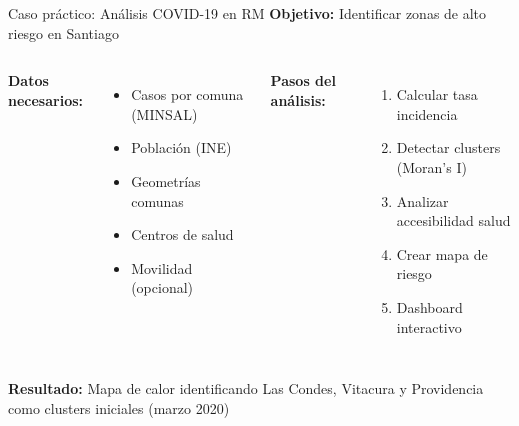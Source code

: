 \documentclass[10pt]{beamer}
\begin{document}
\begin{frame}{Caso práctico: Análisis COVID-19 en RM}
    \textbf{Objetivo:} Identificar zonas de alto riesgo en Santiago
    
    \begin{columns}
        \textbf{Datos necesarios:}
        \begin{itemize}
            \item Casos por comuna (MINSAL)
            \item Población (INE)
            \item Geometrías comunas
            \item Centros de salud
            \item Movilidad (opcional)
        \end{itemize}
        
        \textbf{Pasos del análisis:}
        \begin{enumerate}
            \item Calcular tasa incidencia
            \item Detectar clusters (Moran's I)
            \item Analizar accesibilidad salud
            \item Crear mapa de riesgo
            \item Dashboard interactivo
        \end{enumerate}
    \end{columns}
    
    \vspace{0.3cm}
    \begin{tcolorbox}[colframe=red!50]
        \small
        \textbf{Resultado:} Mapa de calor identificando Las Condes, Vitacura y Providencia como clusters iniciales (marzo 2020)
    \end{tcolorbox}
\end{frame}
\end{document}
